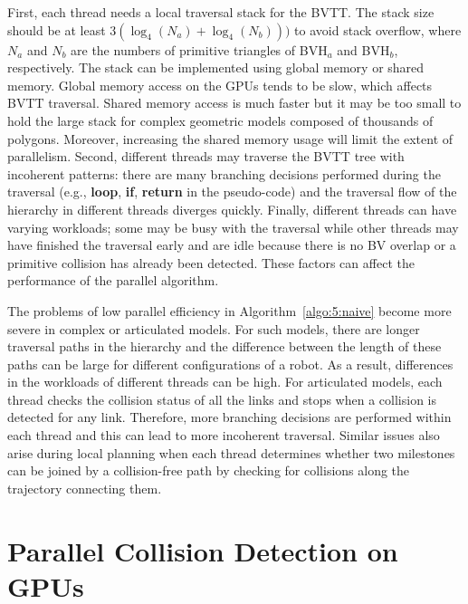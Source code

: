 First, each thread needs a local traversal stack for the BVTT. The stack size should be at least $3 (\log_4(N_a) + \log_4(N_b)))$ to avoid stack overflow, where $N_a$ and $N_b$ are the numbers of primitive triangles of BVH$_a$ and
BVH$_b$, respectively.
The stack can be implemented using global memory or shared memory. Global memory access on the GPUs tends to be slow,
which affects BVTT traversal. Shared memory access is much faster but it may be too small to hold
the large stack for complex geometric models composed of thousands of polygons. Moreover, increasing the shared memory usage will limit the extent of parallelism.
Second, different threads may traverse the BVTT tree with incoherent patterns: there are many branching
decisions performed during the traversal (e.g., \textbf{loop}, \textbf{if}, \textbf{return} in the pseudo-code) and the traversal
flow of the hierarchy in different threads diverges quickly. Finally, different threads can have varying workloads; some may be
busy with the traversal while other threads may have finished the traversal early and are idle because
there is no BV overlap or a primitive collision has already been detected. These factors can affect the
performance of the parallel algorithm.

The problems of low parallel efficiency in Algorithm~\ref{algo:5:naive} become more severe in complex or
articulated models. For such models, there are longer traversal paths in the hierarchy and the difference between
the length of these paths can be large for different configurations of a robot. As a result, differences in the
workloads of different threads can be high. For articulated models, each thread checks the collision status
of all the links and stops when a collision is detected for any link. Therefore, more branching decisions
are performed within each thread and this can lead to more incoherent traversal.
Similar issues also arise during local planning when each thread determines whether two milestones
can be joined by a collision-free path by checking for collisions along the trajectory connecting them.



\section{Parallel Collision Detection on GPUs}
\label{sec:5:algorithm}


